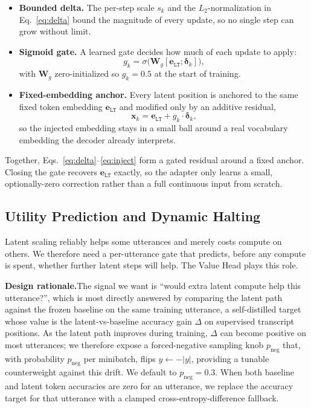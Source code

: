 \documentclass[a4paper]{article}
\newcommand{\vdelta}{\boldsymbol{\delta}}
\begin{document}
\begin{itemize}
    \item \textbf{Bounded delta.} The per-step scale $s_k$ and the $L_2$-normalization in Eq.~\ref{eq:delta} bound the magnitude of every update, so no single step can grow without limit.
    \item \textbf{Sigmoid gate.} A learned gate decides how much of each update to apply:
    \begin{equation}
        g_k = \sigma\big(\mathbf{W}_g [\mathbf{e}_{\texttt{LT}}; \vdelta_k]\big),
        \label{eq:gate}
    \end{equation}
    with $\mathbf{W}_g$ zero-initialized so $g_k{=}0.5$ at the start of training.
    \item \textbf{Fixed-embedding anchor.} Every latent position is anchored to the same fixed token embedding $\mathbf{e}_{\texttt{LT}}$ and modified only by an additive residual,
    \begin{equation}
        \mathbf{x}_k = \mathbf{e}_{\texttt{LT}} + g_k \cdot \vdelta_k,
        \label{eq:inject}
    \end{equation}
    so the injected embedding stays in a small ball around a real vocabulary embedding the decoder already interprets.
\end{itemize}

Together, Eqs.~\ref{eq:delta}--\ref{eq:inject} form a gated residual around a fixed anchor. Closing the gate recovers $\mathbf{e}_{\texttt{LT}}$ exactly, so the adapter only learns a small, optionally-zero correction rather than a full continuous input from scratch.

\subsection{Utility Prediction and Dynamic Halting}
\label{sec:valuehead}

Latent scaling reliably helps some utterances and merely costs compute on others. We therefore need a per-utterance gate that predicts, before any compute is spent, whether further latent steps will help. The Value Head plays this role.

\textbf{Design rationale.}\quad The signal we want is ``would extra latent compute help this utterance?'', which is most directly answered by comparing the latent path against the frozen baseline on the same training utterance, a self-distilled target whose value is the latent-vs-baseline accuracy gain $\Delta$ on supervised transcript positions. As the latent path improves during training, $\Delta$ can become positive on most utterances; we therefore expose a forced-negative sampling knob $p_{\text{neg}}$ that, with probability $p_{\text{neg}}$ per minibatch, flips $y \leftarrow -|y|$, providing a tunable counterweight against this drift. We default to $p_{\text{neg}}{=}0.3$. When both baseline and latent token accuracies are zero for an utterance, we replace the accuracy target for that utterance with a clamped cross-entropy-difference fallback.
\end{document}
